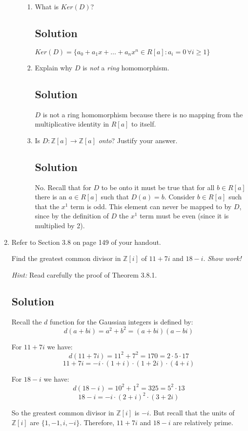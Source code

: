 \documentclass[12pt]{amsart}
\begin{document}
\begin{enumerate}
\begin{enumerate}
\begin{enumerate}
\item What is $Ker(D)$?

\subsection*{Solution}
$Ker(D) = \{ a_0 + a_1 x + \ldots + a_n x^n \in R[a] : a_i = 0 \,\forall i \ge 1\}$

\item Explain why $D$ is {\it not} a {\it ring} homomorphism.

\subsection*{Solution}
$D$ is not a ring homomorphism because there is no mapping from the multiplicative identity in $R[a]$ to itself.

\item Is $D : \mathbb Z[a] \to \mathbb Z[a]$ {\it onto}? Justify your answer.

\subsection*{Solution}
No. Recall that for $D$ to be onto it must be true that for all $b\in R[a]$ there is an $a\in R[a]$ such that $D(a)=b$. Consider $b\in R[a]$ such that the $x^1$ term is odd. This element can never be mapped to by $D$, since by the definition of $D$ the $x^1$ term must be even (since it is multiplied by 2).

\end{enumerate}

\end{enumerate}

\item Refer to Section 3.8 on page 149 of your handout.

Find the greatest common divisor in $\mathbb Z[i]$ of $11 + 7i$ and $18-i$. {\it Show work!}

{\it Hint:} Read carefully the proof of Theorem 3.8.1.

\subsection*{Solution}
Recall the $d$ function for the Gaussian integers is defined by:
\[ d( a + bi ) = a^2 + b^2 = (a+bi)(a-bi) \]

For $11+7i$ we have:
\[ d(11+7i) = 11^2 + 7^2 = 170 = 2\cdot 5\cdot 17\]
\[ 11 + 7i = -i \cdot (1+i) \cdot (1+2i) \cdot (4+i) \]

For $18-i$ we have:
\[ d(18 - i) = 10^2 + 1^2 = 325 = 5^2 \cdot 13 \]
\[ 18-i = -i \cdot (2+i)^2 \cdot (3+2i) \]

So the greatest common divisor in $\mathbb Z[i]$ is $-i$. But recall that the units of $\mathbb Z[i]$ are $\{ 1, -1, i, -i \}$. Therefore, $11+7i$ and $18-i$ are relatively prime.

\end{enumerate}%
\end{document}
